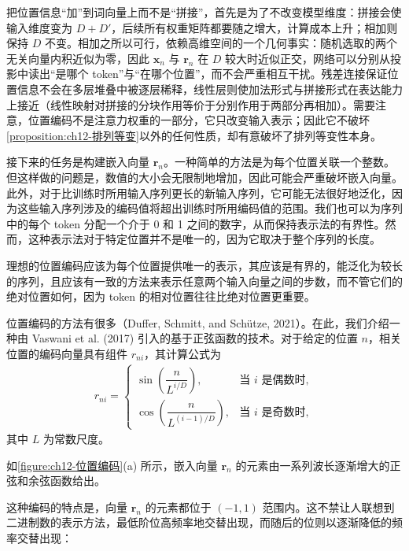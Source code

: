 \documentclass[../../main.tex]{subfiles}
\begin{document}
\begin{remark}
把位置信息“加”到词向量上而不是“拼接”，首先是为了不改变模型维度：拼接会使输入维度变为 $D+D'$，后续所有权重矩阵都要随之增大，计算成本上升；相加则保持 $D$ 不变。相加之所以可行，依赖高维空间的一个几何事实：随机选取的两个无关向量内积近似为零，因此 $\mathbf{x}_n$ 与 $\mathbf{r}_n$ 在 $D$ 较大时近似正交，网络可以分别从投影中读出“是哪个 token”与“在哪个位置”，而不会严重相互干扰。残差连接保证位置信息不会在多层堆叠中被逐层稀释，线性层则使加法形式与拼接形式在表达能力上接近（线性映射对拼接的分块作用等价于分别作用于两部分再相加）。需要注意，位置编码不是注意力权重的一部分，它只改变输入表示；因此它不破坏\cref{proposition:ch12-排列等变}以外的任何性质，却有意破坏了排列等变性本身。
\end{remark}

接下来的任务是构建嵌入向量 $\mathbf{r}_n$。一种简单的方法是为每个位置关联一个整数。但这样做的问题是，数值的大小会无限制地增加，因此可能会严重破坏嵌入向量。此外，对于比训练时所用输入序列更长的新输入序列，它可能无法很好地泛化，因为这些输入序列涉及的编码值将超出训练时所用编码值的范围。我们也可以为序列中的每个 token 分配一个介于 0 和 1 之间的数字，从而保持表示法的有界性。然而，这种表示法对于特定位置并不是唯一的，因为它取决于整个序列的长度。

理想的位置编码应该为每个位置提供唯一的表示，其应该是有界的，能泛化为较长的序列，且应该有一致的方法来表示任意两个输入向量之间的步数，而不管它们的绝对位置如何，因为 token 的相对位置往往比绝对位置更重要。

位置编码的方法有很多（Duffer, Schmitt, and Schütze, 2021）。在此，我们介绍一种由 Vaswani et al. (2017) 引入的基于正弦函数的技术。对于给定的位置 $n$，相关位置的编码向量具有组件 $r_{ni}$，其计算公式为
\begin{align}
r_{ni}=
\begin{cases}
\sin\left(\dfrac{n}{L^{i/D}}\right), & \text{当 }i\text{ 是偶数时},\\[2mm]
\cos\left(\dfrac{n}{L^{(i-1)/D}}\right), & \text{当 }i\text{ 是奇数时},
\end{cases}
\label{align:ch12-正弦位置编码}
\end{align}
其中 $L$ 为常数尺度。

如\cref{figure:ch12-位置编码}(a) 所示，嵌入向量 $\mathbf{r}_n$ 的元素由一系列波长逐渐增大的正弦和余弦函数给出。

这种编码的特点是，向量 $\mathbf{r}_n$ 的元素都位于 $(-1,1)$ 范围内。这不禁让人联想到二进制数的表示方法，最低阶位高频率地交替出现，而随后的位则以逐渐降低的频率交替出现：
\end{document}
